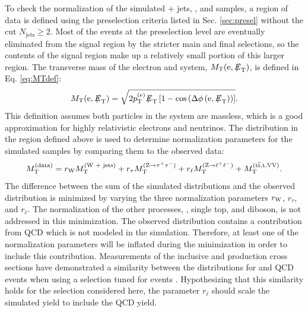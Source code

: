 To check the normalization of the simulated \W + jets, \Zll, and \Ztt samples, a region of data is defined using the preselection criteria listed in Sec. \ref{sec:presel} without the cut $N_{\text{jets}}\geq2$. Most of the events at the preselection level are eventually eliminated from the signal region by the stricter main and final selections, so the contents of the signal region make up a relatively small portion of this larger region. The transverse mass of the electron and \met system, $\MT(\Pe,\met)$, is defined in Eq. \eqref{eq:MTdef}:
\begin{equation}
\MT(\Pe,\met) = \sqrt{2\pt^{(\Pe)}\met\left[1-\text{cos}\left(\Delta\phi\left(\Pe,\met\right)\right)\right]}. \label{eq:MTdef}
\end{equation}
This definition assumes both particles in the system are massless, which is a good approximation for highly relativistic electrons and neutrinos. The \MT distribution in the region defined above is used to determine normalization parameters for the simulated samples by comparing them to the observed data:
\begin{equation}
\MT^{\text{(data)}} = r_{\W}\MT^{\text{(\W + jets)}} + r_{\tau}\MT^{(\Ztt)} + r_{\ell}\MT^{(\Zll)} + \MT^{\text{(\ttbar,\cPqt,VV)}}. \label{Bkg:eq:MTmin}
\end{equation}
The difference between the sum of the simulated \MT distributions and the observed \MT distribution is minimized by varying the three normalization parameters $r_{\mathrm{W}}$, $r_{\tau}$, and $r_{\ell}$. The normalization of the other processes, \ttbar, single top, and diboson, is not addressed in this minimization. The observed distribution contains a contribution from QCD which is not modeled in the simulation. Therefore, at least one of the normalization parameters will be inflated during the minimization in order to include this contribution. Measurements of the inclusive \W and \Z production cross sections have demonstrated a similarity between the \MT distributions for \Zll and QCD events when using a selection tuned for \Wln events \cite{CMS-AN-2010-359,CMS:2011aa}. Hypothesizing that this similarity holds for the selection considered here, the parameter $r_{\ell}$ should scale the simulated \Zll yield to include the QCD yield.

